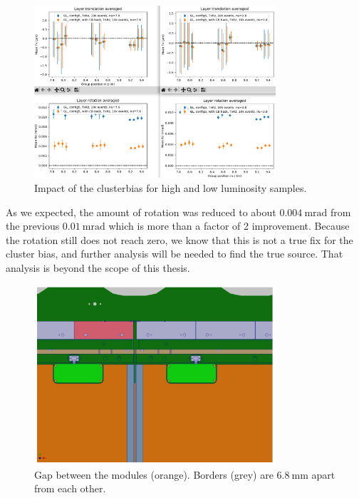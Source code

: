 \begin{figure}
  \centering
  \includegraphics[width=0.8\textwidth]{plots/jan_24_2022/compare_with_without_hack.png}
  \caption{Impact of the clusterbias for high and low luminosity samples.}
  \label{fig:cbhack_on_off}
\end{figure}

As we expected, the amount of rotation was reduced to about
$\SI{0.004}{\milli\radian}$ from the previous $\SI{0.01}{\milli\radian}$ which is more than a factor of 2 improvement. Because the rotation still does not reach zero, we know that this is not a true fix for the cluster bias, and further analysis will be needed to find the true source. That analysis is beyond the scope of this thesis.

\begin{figure}
    \centering
    \includegraphics[width=0.8\textwidth]{plots/module_gap.png}
    \caption{Gap between the modules (orange). Borders (grey) are $\SI{6.8}{\milli\metre}$ apart from each other.}
    \label{fig:module_gap}
\end{figure}

